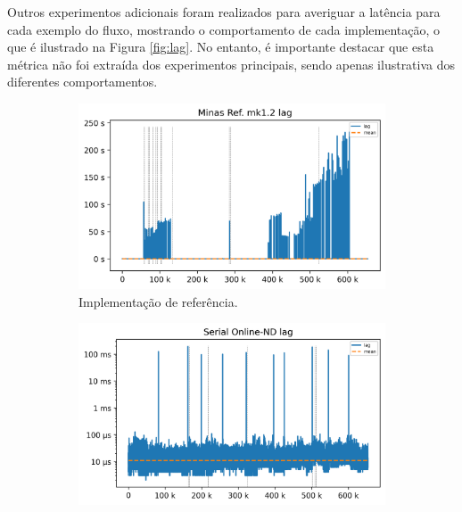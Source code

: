 Outros experimentos adicionais foram realizados para averiguar a latência para
cada exemplo do fluxo, mostrando o comportamento de cada implementação, o que é
ilustrado na Figura \ref{fig:lag}.
No entanto, é importante destacar que esta métrica não foi extraída dos
experimentos principais, sendo apenas ilustrativa dos diferentes comportamentos.


\begin{figure}[h]
  \centering
  \begin{subfigure}{0.48\textwidth}
    \centering
    \includegraphics[width=1\linewidth]{experiments/lag-java.png}
    \caption{Implementação de referência.}
    \label{fig:lag-java}
  \end{subfigure}
  \hfill
  \begin{subfigure}{0.48\textwidth}
    \centering
    \includegraphics[width=1\linewidth]{experiments/lag-serial.png}

\end{subfigure}
\end{figure}

